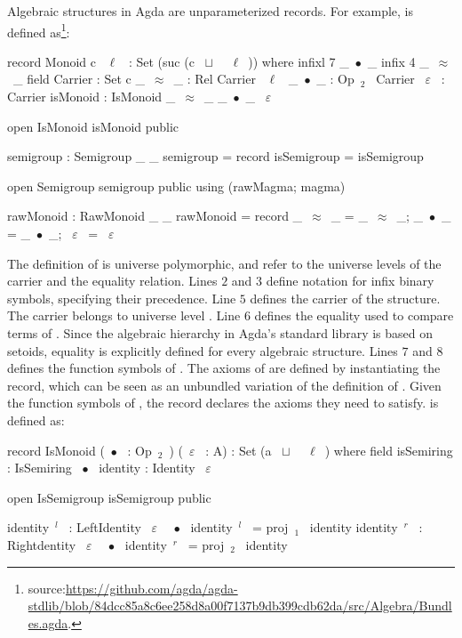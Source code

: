 Algebraic structures in Agda are unparameterized records. For example,  is defined as\footnote{source:\url{https://github.com/agda/agda-stdlib/blob/84dcc85a8c6ee258d8a00f7137b9db399cdb62da/src/Algebra/Bundles.agda}.}:
\begin{agdacodelnos}
record Monoid c ~$\ell$~ : Set (suc (c ~$\sqcup$~ ~$\ell$~)) where 
  infixl 7 _~$\bullet$~_
  infix 4 _~$\approx$~_
  field 
   Carrier : Set c 
   _~$\approx$~_ : Rel Carrier ~$\ell$~ 
   _~$\bullet$~_ : Op~$_2$~ Carrier 
   ~$\varepsilon$~ : Carrier 
   isMonoid : IsMonoid _~$\approx$~_ _~$\bullet$~_ ~$\varepsilon$~ 
   
   open IsMonoid isMonoid public
   
   semigroup : Semigroup _ _
   semigroup = record { isSemigroup = isSemigroup }
   
   open Semigroup semigroup public using (rawMagma; magma)
   
   rawMonoid : RawMonoid _ _
   rawMonoid = record { _~$\approx$~_ = _~$\approx$~_; _~$\bullet$~_ = _~$\bullet$~_; ~$\varepsilon$~ = ~$\varepsilon$~}
\end{agdacodelnos}
\noindent The definition of  is universe polymorphic,  and \lstmath{$\ell$} refer to the universe levels of the carrier and the equality relation. 
Lines $2$ and $3$ define notation for infix binary symbols, specifying their precedence. Line $5$ defines the carrier of the  structure. The carrier belongs to universe level . 
Line $6$ defines the equality used to compare terms of . Since the algebraic hierarchy in Agda's standard library is based on setoids, equality is explicitly defined for every algebraic structure. 
Lines $7$ and $8$ defines the function symbols of . The axioms of  are defined by instantiating the  record, which can be seen as an unbundled variation of the definition of . Given the function symbols of , the  record declares the axioms they need to satisfy.  is defined as: 
\begin{agdacode}
record IsMonoid (~$\bullet$~ : Op~$_2$~) (~$\varepsilon$~ : A) : Set (a ~$\sqcup$~ ~$\ell$~) where 
  field 
   isSemiring : IsSemiring ~$\bullet$~ 
   identity : Identity ~$\varepsilon$~
     
  open IsSemigroup isSemigroup public
     
  identity~$^l$~ : LeftIdentity ~$\varepsilon$~ ~$\bullet$~ 
  identity~$^l$~ = proj~$_1$~ identity  
  identity~$^r$~ : Rightdentity ~$\varepsilon$~ ~$\bullet$~ 
  identity~$^r$~ = proj~$_2$~ identity           
\end{agdacode}

